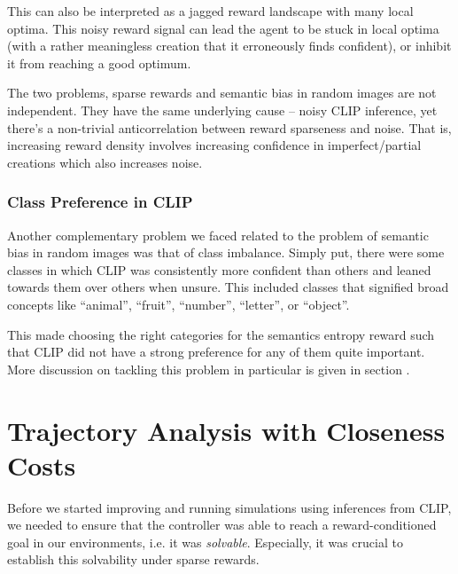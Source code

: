 This can also be interpreted as a jagged reward landscape with many local optima.
This noisy reward signal can lead the agent to be stuck in local optima (with a rather meaningless creation that it erroneously finds confident), or inhibit it from reaching a good optimum.

The two problems, sparse rewards and semantic bias in random images are not independent.
They have the same underlying cause -- noisy CLIP inference, yet there's a non-trivial anticorrelation between reward sparseness and noise.
That is, increasing reward density involves increasing confidence in imperfect/partial creations which also increases noise.


\subsubsection{Class Preference in CLIP}
\label{sec:class-preference}
Another complementary problem we faced related to the problem of semantic bias in random images was that of class imbalance.
Simply put, there were some classes in which CLIP was consistently more confident than others and leaned towards them over others when unsure.
This included classes that signified broad concepts like ``animal'', ``fruit'', ``number'', ``letter'', or ``object''.


This made choosing the right categories for the semantics entropy reward such that CLIP did not have a strong preference for any of them quite important.
More discussion on tackling this problem in particular is given in section .


\section{Trajectory Analysis with Closeness Costs}
\label{sec:closeness-rollouts}
Before we started improving and running simulations using inferences from CLIP, we needed to ensure that the controller was able to reach a reward-conditioned goal in our environments, i.e. it was \emph{solvable}.
Especially, it was crucial to establish this solvability under sparse rewards.

